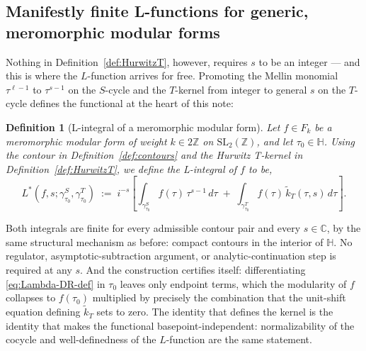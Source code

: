 \documentclass[11pt]{article}
\newtheorem{definition}[theorem]{Definition}
\numberwithin{equation}{section}  %
\newcommand{\HH}{\mathbb{H}}
\newcommand{\ZZ}{\mathbb{Z}}
\newcommand{\CC}{\mathbb{C}}
\newcommand{\SLZ}{\mathrm{SL}_2(\ZZ)}
\begin{document}
\subsection{Manifestly finite L-functions for generic, meromorphic modular forms}

Nothing in Definition~\ref{def:HurwitzT}, however, requires $s$ to be an
integer --- and this is where the $L$-function arrives for free.
Promoting the Mellin monomial $\tau^{\ell - 1}$ to $\tau^{s - 1}$ on the
$S$-cycle and the $T$-kernel from integer to general $s$ on the $T$-cycle
defines the functional at the heart of this note:

\begin{definition}[L-integral of a meromorphic modular form]\label{def:L-integral}
Let $f \in F_k$ be a meromorphic modular form of weight $k \in 2\ZZ$ on $\SLZ$, and let $\tau_0 \in \HH$. Using the contour in Definition~\ref{def:contours} and the Hurwitz T-kernel in Definition~\ref{def:HurwitzT}, we define the \emph{L-integral} of $f$ to be,
\begin{equation}\label{eq:Lambda-DR-def}
  L^*(f, s; \gamma^S_{\tau_0}
  , \gamma^T_{\tau_0})
  \;:=\; i^{-s}\!\left[
    \int_{\gamma^S_{\tau_0}}
    \! f(\tau)\,\tau^{s-1}\,d\tau
    \;+\;
    \int_{\gamma^T_{\tau_0}}
    f(\tau)\,\widetilde{k}_T(\tau, s)\,d\tau
  \right].
\end{equation}
\end{definition}

Both integrals are finite for every admissible contour pair and every
$s \in \CC$, by the same structural mechanism as before: compact contours
in the interior of $\HH$.  No regulator, asymptotic-subtraction argument,
or analytic-continuation step is required at any $s$.  And the
construction certifies itself: differentiating \eqref{eq:Lambda-DR-def}
in $\tau_0$ leaves only endpoint terms, which the modularity of $f$
collapses to $f(\tau_0)$ multiplied by precisely the combination that the
unit-shift equation defining $\widetilde{k}_T$ sets to zero.  The
identity that defines the kernel is the identity that makes the
functional basepoint-independent: normalizability of the cocycle and
well-definedness of the $L$-function are the same statement.
\end{document}

